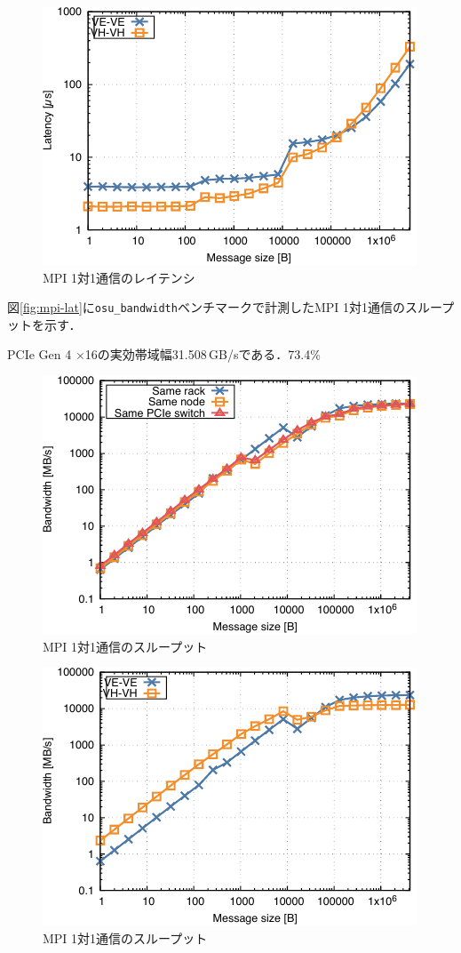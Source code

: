 ﻿\documentclass[submit,techrep,noauthor]{ipsj}
\begin{document}
\begin{figure}
  \centering
  \includegraphics{figs/mpi_latency_vhve.pdf}
  \caption{MPI 1対1通信のレイテンシ}\label{fig:mpi-lat-vh}
\end{figure}

図\ref{fig:mpi-lat}に\verb|osu_bandwidth|ベンチマークで計測したMPI 1対1通信のスループットを示す．

PCIe Gen 4 $\times$16の実効帯域幅31.508\,GB/sである．73.4\%

\begin{figure}
  \centering
  \includegraphics{figs/mpi_bandwidth.pdf}
  \caption{MPI 1対1通信のスループット}\label{fig:bw}
\end{figure}

\begin{figure}
  \centering
  \includegraphics{figs/mpi_bandwidth_vhve.pdf}
  \caption{MPI 1対1通信のスループット}\label{fig:bw-vh}
\end{figure}
\end{document}
